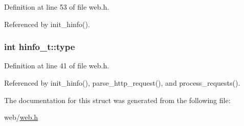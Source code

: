 Definition at line 53 of file web.\-h.



Referenced by init\-\_\-hinfo().

\hypertarget{structhinfo__t_a4e896141431943909a71282fc56799fb}{
\subsubsection[{type}]{\setlength{\rightskip}{0pt plus 5cm}int hinfo\-\_\-t\-::type}}\label{structhinfo__t_a4e896141431943909a71282fc56799fb}


Definition at line 41 of file web.\-h.



Referenced by init\-\_\-hinfo(), parse\-\_\-http\-\_\-request(), and process\-\_\-requests().



The documentation for this struct was generated from the following file\-:\begin{DoxyCompactItemize}
\item 
web/\hyperlink{web_8h}{web.\-h}\end{DoxyCompactItemize}
